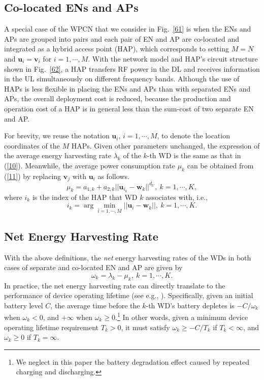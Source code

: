 \documentclass[journal, draftcls, one column, 12pt]{IEEEtran}
\begin{document}
\subsection{Co-located ENs and APs}
A special case of the WPCN that we consider in Fig.~\ref{61} is when the ENs and APs are grouped into pairs and each pair of EN and AP are co-located and integrated as a hybrid access point (HAP), which corresponds to setting $M=N$ and $\mathbf{u}_i =\mathbf{v}_i$ for $i=1,\cdots,M$. With the network model and HAP's circuit structure shown in Fig.~\ref{62}, a HAP transfers RF power in the DL and receives information in the UL simultaneously on different frequency bands. Although the use of HAPs is less flexible in placing the ENs and APs than with separated ENs and APs, the overall deployment cost is reduced, because the production and operation cost of a HAP is in general less than the sum-cost of two separate EN and AP.

For brevity, we reuse the notation $\mathbf{u}_i$, $i=1,\cdots,M$, to denote the location coordinates of the $M$ HAPs. Given other parameters unchanged, the expression of the average energy harvesting rate $\lambda_k$ of the $k$-th WD is the same as that in (\ref{10}). Meanwhile, the average power consumption rate $\mu_k$ can be obtained from (\ref{11}) by replacing $\mathbf{v}_j$ with $\mathbf{u}_i$ as follows.
\begin{equation}
\label{17}
\mu_k = a_{1,k} + a_{2,k} ||\mathbf{u}_{i_k} - \mathbf{w}_k||^{d_U}, \ k=1,\cdots,K,
\end{equation}
where $i_k$ is the index of the HAP that WD $k$ associates with, i.e.,
\begin{equation}
i_k = \arg \min_{i=1,\cdots,M} ||\mathbf{u}_i - \mathbf{w}_k||, \ k=1,\cdots,K.
\end{equation}

\subsection{Net Energy Harvesting Rate}
With the above definitions, the \textit{net} energy harvesting rates of the WDs in both cases of separate and co-located EN and AP are given by
\begin{equation}
\label{23}
\omega_k = \lambda_k - \mu_k,\ k=1,\cdots,K.
\end{equation}
In practice, the net energy harvesting rate can directly translate to the performance of device operating lifetime (see e.g., \cite{2015:Bi}). Specifically, given an initial battery level $C$, the average time before the $k$-th WD's battery depletes is $-C/\omega_k$ when $\omega_k<0$, and $+\infty$ when $\omega_k\geq 0$.\footnote{We neglect in this paper the battery degradation effect \cite{2013:Michelusi} caused by repeated charging and discharging.} In other words, given a minimum device operating lifetime requirement $T_k>0$, it must satisfy $\omega_k \geq -C/T_k$ if $T_k<\infty$, and $\omega_k\geq 0$ if $T_k = \infty$.
\end{document}
